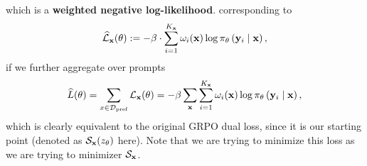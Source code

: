 \documentclass[11pt]{article}  %
\begin{document}
which is a \textbf{weighted negative log-likelihood}. corresponding to 
\begin{align*}
  \widehat{\mathcal{L}}_{\mathbf{x}}(\theta) := -\beta \cdot \sum_{i=1}^{{K_{\mathbf{x}}}}\omega_i(\mathbf{x}) \log \pi_{\theta}\left( \mathbf{y}_i \mid \mathbf{x} \right),
\end{align*}
if we further aggregate over prompts 
\begin{align*}
  \widehat{L}(\theta) =  \sum_{x \in \mathcal{D}_{\text{pref}}} \mathcal{L}_{\mathbf{x}}(\theta) = -\beta \sum_{\mathbf{x}} \sum_{i=1}^{K_{\mathbf{x}}} \omega_i(\mathbf{x})\log \pi_{\theta}\left( \mathbf{y}_i \mid \mathbf{x} \right),
\end{align*}
which is clearly equivalent to the original GRPO dual loss, since it is our starting point (denoted as $\mathcal{S}_{\mathbf{x}}(z_\theta)$ here). 
Note that we are trying to minimize this loss as we are trying to minimizer $\mathcal{S}_{\mathbf{x}}$.
\end{document}

